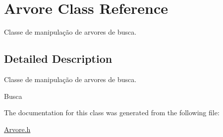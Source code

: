 \hypertarget{classArvore}{}\section{Arvore Class Reference}
\label{classArvore}


Classe de manipulação de arvores de busca.  




\subsection{Detailed Description}
Classe de manipulação de arvores de busca. 

Busca 

The documentation for this class was generated from the following file\+:\begin{DoxyCompactItemize}
\item 
\hyperlink{Arvore_8h}{Arvore.\+h}\end{DoxyCompactItemize}
